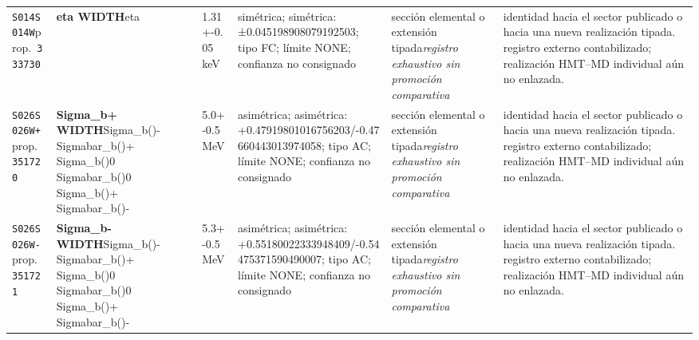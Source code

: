 \begin{landscape}
\begin{longtable}{L{1.85cm}L{4.45cm}L{2.35cm}L{4.05cm}L{3.35cm}L{7.15cm}}
\texttt{S014}\newline \texttt{S014W}\newline prop.\ \texttt{333730} & \textbf{eta WIDTH}\newline eta & 1.31+-0.05\,keV & simétrica; simétrica: ±0.045198908079192503; tipo FC; límite NONE; confianza no consignado & sección elemental o extensión tipada\newline \emph{registro exhaustivo sin promoción comparativa} & identidad hacia el sector publicado o hacia una nueva realización tipada. registro externo contabilizado; realización HMT--MD individual aún no enlazada. \\
\texttt{S026}\newline \texttt{S026W+}\newline prop.\ \texttt{351720} & \textbf{Sigma\_\allowbreak{}b+ WIDTH}\newline Sigma\_\allowbreak{}b()- \textbar{}\allowbreak{} Sigmabar\_\allowbreak{}b()+ \textbar{}\allowbreak{} Sigma\_\allowbreak{}b()0 \textbar{}\allowbreak{} Sigmabar\_\allowbreak{}b()0 \textbar{}\allowbreak{} Sigma\_\allowbreak{}b()+ \textbar{}\allowbreak{} Sigmabar\_\allowbreak{}b()- & 5.0+-0.5\,MeV & asimétrica; asimétrica: +0.47919801016756203/-0.47660443013974058; tipo AC; límite NONE; confianza no consignado & sección elemental o extensión tipada\newline \emph{registro exhaustivo sin promoción comparativa} & identidad hacia el sector publicado o hacia una nueva realización tipada. registro externo contabilizado; realización HMT--MD individual aún no enlazada. \\
\texttt{S026}\newline \texttt{S026W-}\newline prop.\ \texttt{351721} & \textbf{Sigma\_\allowbreak{}b- WIDTH}\newline Sigma\_\allowbreak{}b()- \textbar{}\allowbreak{} Sigmabar\_\allowbreak{}b()+ \textbar{}\allowbreak{} Sigma\_\allowbreak{}b()0 \textbar{}\allowbreak{} Sigmabar\_\allowbreak{}b()0 \textbar{}\allowbreak{} Sigma\_\allowbreak{}b()+ \textbar{}\allowbreak{} Sigmabar\_\allowbreak{}b()- & 5.3+-0.5\,MeV & asimétrica; asimétrica: +0.55180022333948409/-0.54475371590490007; tipo AC; límite NONE; confianza no consignado & sección elemental o extensión tipada\newline \emph{registro exhaustivo sin promoción comparativa} & identidad hacia el sector publicado o hacia una nueva realización tipada. registro externo contabilizado; realización HMT--MD individual aún no enlazada. \\

\end{longtable}
\end{landscape}
